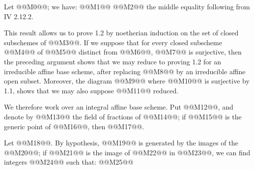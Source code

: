 Let @@M0@@; we have:
@@M1@@
@@M2@@
the middle equality following from IV 2.12.2.

This result allows us to prove 1.2 by noetherian induction on the set of closed subschemes of @@M3@@. If we suppose that for every closed subscheme @@M4@@ of @@M5@@ distinct from @@M6@@, @@M7@@ is surjective, then the preceding argument shows that we may reduce to proving 1.2 for an irreducible affine base scheme, after replacing @@M8@@ by an irreducible affine open subset. Moreover, the diagram
@@M9@@
where @@M10@@ is surjective by 1.1, shows that we may also suppose @@M11@@ reduced.

We therefore work over an integral affine base scheme. Put @@M12@@, and denote by @@M13@@ the field of fractions of @@M14@@; if @@M15@@ is the generic point of @@M16@@, then @@M17@@.

Let @@M18@@. By hypothesis, @@M19@@ is generated by the images of the @@M20@@; if @@M21@@ is the image of @@M22@@ in @@M23@@, we can find integers @@M24@@ such that:
@@M25@@
